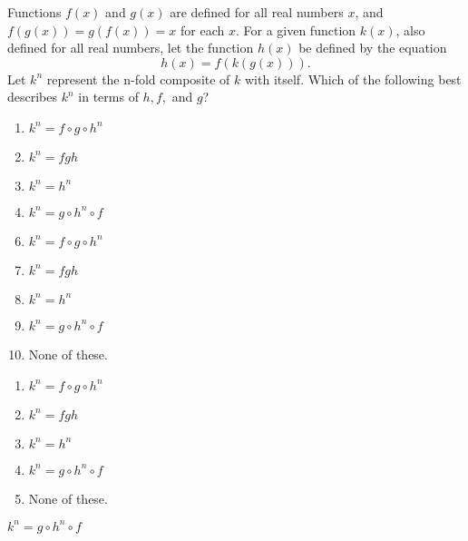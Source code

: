 Functions $f(x)$ and $g(x)$ are defined for all real numbers $x$, and $f(g(x))=g(f(x))=x$ for each $x$. For a given function $k(x)$, also defined for all real numbers, let the function $h(x)$ be defined by the equation
\[h(x) = f(k(g(x))).\] Let $k^n$ represent the n-fold composite of $k$ with itself. Which of the following best describes $k^n$ in terms of $h,f,$ and $g$?


\ifsat
	\begin{enumerate}[label=\Alph*)]
		\item $k^n=f\circ g \circ h^n$
		\item $k^n=fgh$
		\item $k^n=h^n$
		\item $k^n=g\circ h^n \circ f$%
	\end{enumerate}
\else
\fi

\ifacteven
	\begin{enumerate}[label=\textbf{\Alph*.},itemsep=\fill,align=left]
		\setcounter{enumii}{5}
		\item $k^n=f\circ g \circ h^n$
		\item $k^n=fgh$
		\item $k^n=h^n$
		\addtocounter{enumii}{1}
		\item $k^n=g\circ h^n \circ f$%
		\item None of these.
	\end{enumerate}
\else
\fi

\ifactodd
	\begin{enumerate}[label=\textbf{\Alph*.},itemsep=\fill,align=left]
		\item $k^n=f\circ g \circ h^n$
		\item $k^n=fgh$
		\item $k^n=h^n$
		\item $k^n=g\circ h^n \circ f$%
		\item None of these.
	\end{enumerate}
\else
\fi

\ifgridin
 $k^n=g\circ h^n \circ f$%

\else
\fi


